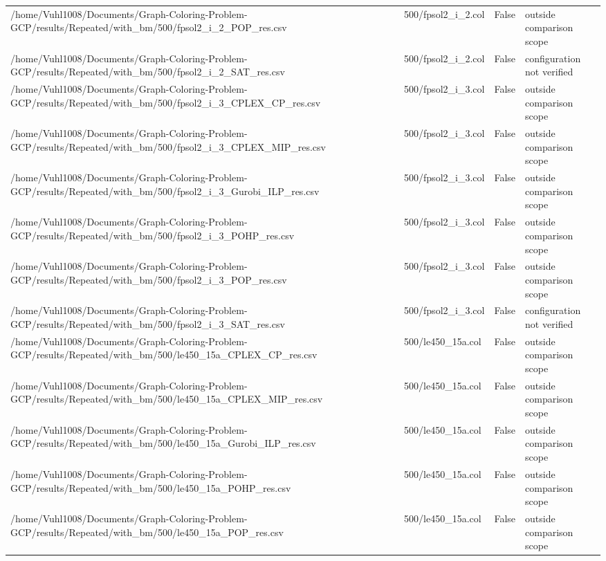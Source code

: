 \begin{table}[htbp]
\begin{tabular}{llll}
/home/Vuhl1008/Documents/Graph-Coloring-Problem-GCP/results/Repeated/with\_bm/500/fpsol2\_i\_2\_POP\_res.csv & 500/fpsol2\_i\_2.col & False & outside comparison scope \\
/home/Vuhl1008/Documents/Graph-Coloring-Problem-GCP/results/Repeated/with\_bm/500/fpsol2\_i\_2\_SAT\_res.csv & 500/fpsol2\_i\_2.col & False & configuration not verified \\
/home/Vuhl1008/Documents/Graph-Coloring-Problem-GCP/results/Repeated/with\_bm/500/fpsol2\_i\_3\_CPLEX\_CP\_res.csv & 500/fpsol2\_i\_3.col & False & outside comparison scope \\
/home/Vuhl1008/Documents/Graph-Coloring-Problem-GCP/results/Repeated/with\_bm/500/fpsol2\_i\_3\_CPLEX\_MIP\_res.csv & 500/fpsol2\_i\_3.col & False & outside comparison scope \\
/home/Vuhl1008/Documents/Graph-Coloring-Problem-GCP/results/Repeated/with\_bm/500/fpsol2\_i\_3\_Gurobi\_ILP\_res.csv & 500/fpsol2\_i\_3.col & False & outside comparison scope \\
/home/Vuhl1008/Documents/Graph-Coloring-Problem-GCP/results/Repeated/with\_bm/500/fpsol2\_i\_3\_POHP\_res.csv & 500/fpsol2\_i\_3.col & False & outside comparison scope \\
/home/Vuhl1008/Documents/Graph-Coloring-Problem-GCP/results/Repeated/with\_bm/500/fpsol2\_i\_3\_POP\_res.csv & 500/fpsol2\_i\_3.col & False & outside comparison scope \\
/home/Vuhl1008/Documents/Graph-Coloring-Problem-GCP/results/Repeated/with\_bm/500/fpsol2\_i\_3\_SAT\_res.csv & 500/fpsol2\_i\_3.col & False & configuration not verified \\
/home/Vuhl1008/Documents/Graph-Coloring-Problem-GCP/results/Repeated/with\_bm/500/le450\_15a\_CPLEX\_CP\_res.csv & 500/le450\_15a.col & False & outside comparison scope \\
/home/Vuhl1008/Documents/Graph-Coloring-Problem-GCP/results/Repeated/with\_bm/500/le450\_15a\_CPLEX\_MIP\_res.csv & 500/le450\_15a.col & False & outside comparison scope \\
/home/Vuhl1008/Documents/Graph-Coloring-Problem-GCP/results/Repeated/with\_bm/500/le450\_15a\_Gurobi\_ILP\_res.csv & 500/le450\_15a.col & False & outside comparison scope \\
/home/Vuhl1008/Documents/Graph-Coloring-Problem-GCP/results/Repeated/with\_bm/500/le450\_15a\_POHP\_res.csv & 500/le450\_15a.col & False & outside comparison scope \\
/home/Vuhl1008/Documents/Graph-Coloring-Problem-GCP/results/Repeated/with\_bm/500/le450\_15a\_POP\_res.csv & 500/le450\_15a.col & False & outside comparison scope \\

\end{tabular}
\end{table}
